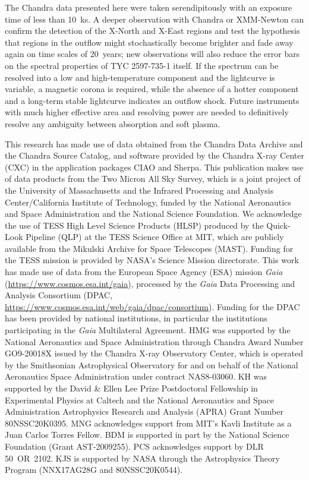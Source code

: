 \documentclass[linenumbers]{aastex631}
\begin{document}
The Chandra data presented here were taken serendipitously with an exposure time of less than 10~ks. A deeper observation with Chandra or XMM-Newton can confirm the detection of the X-North and X-East regions and test the hypothesis that regions in the outflow might stochastically become brighter and fade away again on time scales of 20~years; new observations will also reduce the error bars on the spectral properties of TYC 2597-735-1 itself. If the spectrum can be resolved into a low and high-temperature component and the lightcurve is variable, a magnetic corona is required, while the absence of a hotter component and a long-term stable lightcurve indicates an outflow shock. Future instruments with much higher effective area and resolving power are needed to definitively resolve any ambiguity between absorption and soft plasma.

\begin{acknowledgements}
This research has made use of data obtained from the Chandra Data Archive and the Chandra Source Catalog, and software provided by the Chandra X-ray Center (CXC) in the application packages CIAO and Sherpa. This publication makes use of data products from the Two Micron All Sky Survey, which is a joint project of the University of Massachusetts and the Infrared Processing and Analysis Center/California Institute of Technology, funded by the National Aeronautics and Space Administration and the National Science Foundation. We acknowledge the use of TESS High Level Science Products (HLSP) produced by the Quick-Look Pipeline (QLP) at the TESS Science Office at MIT, which are publicly available from the Mikulski Archive for Space Telescopes (MAST). Funding for the TESS mission is provided by NASA's Science Mission directorate.
This work has made use of data from the European Space Agency (ESA) mission {\it Gaia} (\url{https://www.cosmos.esa.int/gaia}), processed by the {\it Gaia} Data Processing and Analysis Consortium (DPAC, \url{https://www.cosmos.esa.int/web/gaia/dpac/consortium}). Funding for the DPAC has been provided by national institutions, in particular the institutions participating in the {\it Gaia} Multilateral Agreement.
HMG was supported by the National Aeronautics and Space Administration through Chandra Award Number GO9-20018X issued by the Chandra X-ray Observatory Center, which is operated by the Smithsonian Astrophysical Observatory for and on behalf of the National Aeronautics Space Administration under contract NAS8-03060.
KH was supported by the David {\&} Ellen Lee Prize Postdoctoral Fellowship in Experimental Physics at Caltech and the National Aeronautics and Space Administration Astrophysics Research and Analysis (APRA) Grant Number 80NSSC20K0395.
MNG acknowledges support from MIT's Kavli Institute as a Juan Carlos Torres Fellow.  BDM is supported in part by the National Science Foundation (Grant AST-2009255). PCS acknowledges support by DLR 50~OR~2102.  KJS is supported by NASA through the Astrophysics Theory Program (NNX17AG28G and 80NSSC20K0544).
\end{acknowledgements}
\end{document}
